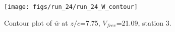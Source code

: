 \begin{figure}[H]
\centering
\texttt{[image: figs/run\_24/run\_24\_W\_contour]}
\caption{Contour plot of $\overline{w}$ at $z/c$=7.75, $V_{free}$=21.09, station 3.}
\label{fig:run_24_W_contour}
\end{figure}


